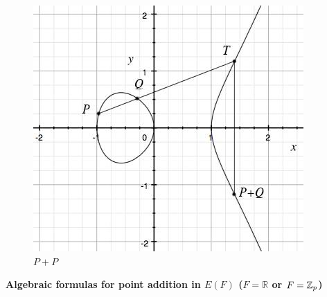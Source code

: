 \documentclass[a4paper,12pt]{article}
\begin{document}
\begin{figure}[h!]
\begin{minipage}{0.45\textwidth}
\caption{$P+(-P)$}
\end{minipage}
\hspace{0.05\textwidth}
\begin{minipage}{0.45\textwidth}
\includegraphics[width=\textwidth]{fig-mar19-3}
\caption{$P+P$}
\end{minipage}
\hspace{0.05\textwidth}
\end{figure}


{\bf Algebraic formulas for point addition in $E(F)$
($F=\mathbb{R}$ or $F=\mathbb{Z}_p$)}
\end{document}
